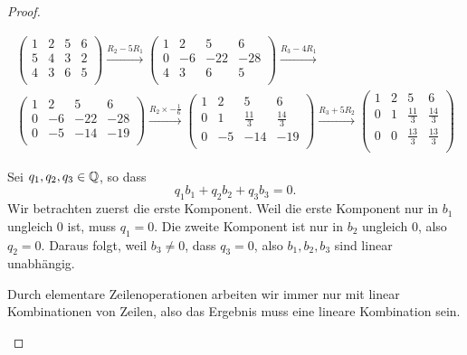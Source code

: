 \begin{proof}
\begin{parts}
\item 
	\begin{gather*}
	\left(
\begin{array}{cccc}
 1 & 2 & 5 & 6 \\
 5 & 4 & 3 & 2 \\
 4 & 3 & 6 & 5 \\
\end{array}
\right) \xrightarrow{R_2-5R_1} \left(
\begin{array}{cccc}
 1 & 2 & 5 & 6 \\
 0 & -6 & -22 & -28 \\
 4 & 3 & 6 & 5 \\
\end{array}
\right) \xrightarrow{R_3-4R_1}\\ \left(
\begin{array}{cccc}
 1 & 2 & 5 & 6 \\
 0 & -6 & -22 & -28 \\
 0 & -5 & -14 & -19 \\
\end{array}
\right) \xrightarrow{R_2\times -\frac{1}{6}} \left(
\begin{array}{cccc}
 1 & 2 & 5 & 6 \\
 0 & 1 & \frac{11}{3} & \frac{14}{3} \\
 0 & -5 & -14 & -19 \\
\end{array}
\right) \xrightarrow{R_3+5R_2} \left(
\begin{array}{cccc}
 1 & 2 & 5 & 6 \\
 0 & 1 & \frac{11}{3} & \frac{14}{3} \\
 0 & 0 & \frac{13}{3} & \frac{13}{3} \\
\end{array}
\right)	
	\end{gather*}
\item Sei $q_1,q_2,q_3\in \mathbb{Q}$, so dass
	\[
	q_1b_1+q_2b_2+q_3b_3=0
	.\] 
	Wir betrachten zuerst die erste Komponent. Weil die erste Komponent nur in $b_1$ ungleich $0$ ist, muss $q_1=0$. Die zweite Komponent ist nur in $b_2$ ungleich $0$, also $q_2=0$. Daraus folgt, weil $b_3\neq 0$, dass $q_3=0$, also $b_1,b_2,b_3$ sind linear unabhängig.
\item Durch elementare Zeilenoperationen arbeiten wir immer nur mit linear Kombinationen von Zeilen, also das Ergebnis muss eine lineare Kombination sein.


\end{parts}
\end{proof}
